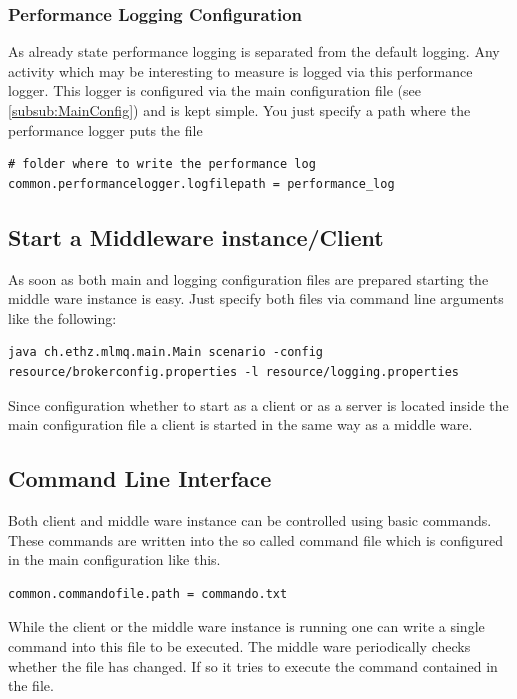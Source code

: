 \documentclass[a4paper]{article}
\begin{document}
\subsubsection{Performance Logging Configuration}
\label{subsub:PerfLogConfig}

As already state performance logging is separated from the default logging. Any activity which may be interesting to measure is logged via this performance logger. This logger is configured via the main configuration file (see \ref{subsub:MainConfig}) and is kept simple. You just specify a path where the performance logger puts the file

\begin{verbatim} 
# folder where to write the performance log
common.performancelogger.logfilepath = performance_log
\end{verbatim}

\subsection{Start a Middleware instance/Client}
As soon as both main and logging configuration files are prepared starting the middle ware instance is easy. Just specify both files via command line arguments like the following:

\begin{verbatim} 
java ch.ethz.mlmq.main.Main scenario -config resource/brokerconfig.properties -l resource/logging.properties
\end{verbatim}

Since configuration whether to start as a client or as a server is located inside the main configuration file a client is started in the same way as a middle ware.

\subsection{Command Line Interface}

Both client and middle ware instance can be controlled using basic commands. These commands are written into the so called command file which is configured in the main configuration like this.

\begin{verbatim}
common.commandofile.path = commando.txt
\end{verbatim}

While the client or the middle ware instance is running one can write a single command into this file to be executed. The middle ware periodically checks whether the file has changed. If so it tries to execute the command contained in the file.
\end{document}
